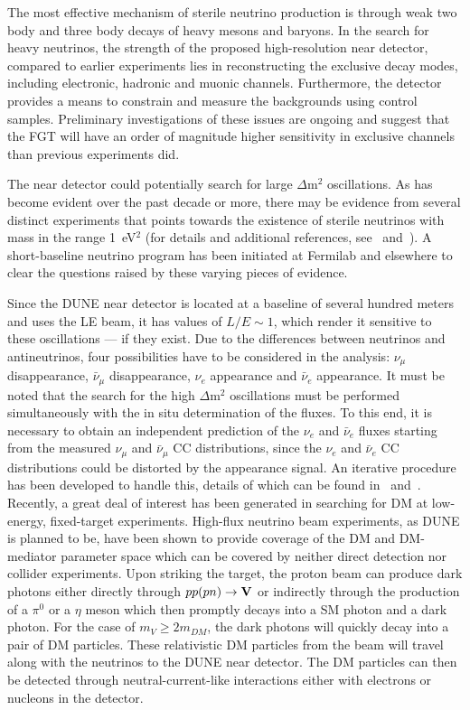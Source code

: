 The most effective mechanism of sterile neutrino production is through
weak two body and three body decays of heavy mesons and baryons. In
the search for heavy neutrinos, the strength of the proposed
high-resolution near detector, compared to earlier experiments lies in
reconstructing the exclusive decay modes, including electronic,
hadronic and muonic channels. Furthermore, the detector provides a
means to constrain and measure the backgrounds using control
samples. Preliminary investigations of these issues are ongoing and
suggest that the FGT will have an order of magnitude higher
sensitivity in exclusive channels than previous experiments did.


The near detector could potentially search for large $\Delta$m$^2$
oscillations. As has become evident over the past decade or more,
there may be evidence from several distinct experiments that points
towards the existence of sterile neutrinos with mass in the range
1~eV$^2$ (for details and additional references, see~\cite{DPR}
and~\cite{Adams:2013qkq}).  A short-baseline neutrino program has been
initiated at Fermilab and elsewhere to clear the questions raised by
these varying pieces of evidence.

Since the DUNE near detector is located at a baseline of several
hundred meters and uses the LE beam, it has values of $L/E \sim 1$,
which render it sensitive to these oscillations --- if they exist. Due
to the differences between neutrinos and antineutrinos, four
possibilities have to be considered in the analysis: $\nu_\mu$
disappearance, $\bar \nu_\mu$ disappearance, $\nu_e$ appearance and
$\bar \nu_e$ appearance.  It must be noted that the search for the
high $\Delta$m$^2$ oscillations must be performed simultaneously with
the in situ determination of the fluxes.  To this end, it is necessary
to obtain an independent prediction of the $\nu_e$ and $\bar \nu_e$
fluxes starting from the measured $\nu_\mu$ and $\bar \nu_\mu$ CC
distributions, since the $\nu_e$ and $\bar \nu_e$ CC distributions
could be distorted by the appearance signal.  An iterative procedure
has been developed to handle this, details of which
can be found in~\cite{DPR} and~\cite{Adams:2013qkq}.\\

Recently, a great deal of interest has been generated in searching for
DM at low-energy, fixed-target experiments.  High-flux neutrino beam
experiments, as DUNE is planned to be, have been shown to provide
coverage of the DM and DM-mediator parameter space which can be
covered by neither direct detection nor collider experiments. Upon
striking the target, the proton beam can produce dark photons either
directly through $pp(pn)\rightarrow \bf {V}$ or indirectly through the
production of a $\pi^{0}$ or a $\eta$ meson which then promptly decays
into a SM photon and a dark photon. For the case of $m_{V}\geq
2m_{DM}$, the dark photons will quickly decay into a pair of DM
particles.  These relativistic DM particles from the beam will travel
along with the neutrinos to the DUNE near detector.  The DM particles
can then be detected through neutral-current-like interactions either
with electrons or nucleons in the detector.

